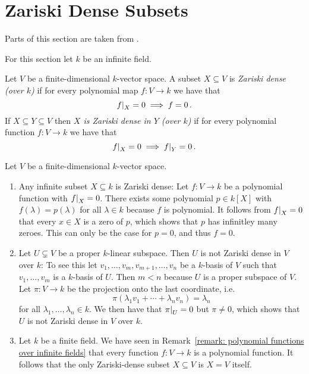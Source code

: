 \section{Zariski Dense Subsets}


\begin{fluff}
  Parts of this section are taken from \cite[\S 1.3]{InvariantPrimer}.
\end{fluff}


\begin{conventions}
  For this section let $k$ be an infinite field.
\end{conventions}


\begin{definition}
  \label{definition: Zariski density}
  Let $V$ be a finite-dimensional $k$-vector space.
  A subset $X \subseteq V$ is \emph{Zariski dense \textup(over $k$\textup)} if for every polynomial map $f \colon V \to k$ we have that
  \[
              \restrict{f}{X} = 0
    \implies  f = 0 \,.
  \]
  If $X \subseteq Y \subseteq V$ then \emph{$X$ is Zariski dense in $Y$ \textup(over $k$\textup)} if for every polynomial function $f \colon V \to k$ we have that
  \[
              \restrict{f}{X} = 0
    \implies  \restrict{f}{Y} = 0 \,.
  \]
\end{definition}


\begin{example}
  Let $V$ be a finite-dimensional $k$-vector space.
  \begin{enumerate}
    \item 
      Any infinite subset $X \subseteq k$ is Zariski dense:
      Let $f \colon V \to k$ be a polynomial function with $\restrict{f}{X} = 0$.
      There exists some polynomial $p \in k[X]$ with $f(\lambda) = p(\lambda)$ for all $\lambda \in k$ because $f$ is polynomial.
      It follows from $\restrict{f}{X} = 0$ that every $x \in X$ is a zero of $p$, which shows that $p$ has infinitley many zeroes.
      This can only be the case for $p = 0$, and thus $f = 0$.
    \item
      Let $U \subsetneq V$ be a proper $k$-linear subspace.
      Then $U$ is not Zariski dense in $V$ over $k$:
      To see this let $v_1, \dotsc, v_m, v_{m+1}, \dotsc, v_n$ be a $k$-basis of $V$ such that $v_1, \dotsc, v_m$ is a $k$-basis of $U$.
      Then $m < n$ because $U$ is a proper subspace of $V$.
      Let $\pi \colon V \to k$ be the projection onto the last coordinate, i.e.
      \[
          \pi\left( \lambda_1 v_1 + \dotsb + \lambda_n v_n \right)
        = \lambda_n
      \]
      for all $\lambda_1, \dotsc, \lambda_n \in k$.
      We then have that $\restrict{\pi}{U} = 0$ but $\pi \neq 0$, which shows that $U$ is not Zariski dense in $V$ over $k$.
    \item
      Let $k$ be a finite field.
      We have seen in Remark~\ref{remark: polynomial functions over infinite fields} that every function $f \colon V \to k$ is a polynomial function.
      It follows that the only Zariski-dense subset $X \subseteq V$ is $X = V$ itself.
  \end{enumerate}
\end{example}


